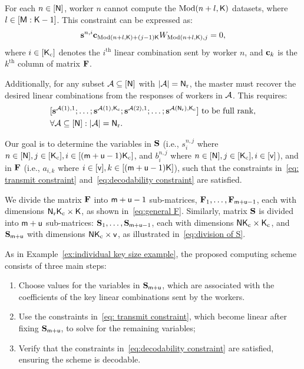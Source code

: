 \documentclass[conference,letterpaper]{IEEEtran}
\begin{document}
For each \( n \in [{\sf N}] \), worker \( n \) cannot compute the \( \text{Mod}(n+l,{\sf K}) \) datasets, where \( l \in [{\sf M}:{\sf K} - 1] \). This constraint can be expressed as:
\begin{align}
{\bf s}^{n,i} {\bf c}_{\text{Mod}(n+l,{\sf K}) + (j-1){\sf K}} W_{\text{Mod}(n+l,{\sf K}), j} = 0,  \label{eq: transmit constraint}
\end{align}
where \( i \in [{\sf K}_{\rm c}] \) denotes the \( i^{\text{th}} \) linear combination sent by worker \( n \), and \( {\bf c}_{k} \) is the \( k^{\text{th}} \) column of matrix \( {\bf F} \).

Additionally, for any subset \({\cal A} \subseteq [{\sf N}]\) with \( |{\cal A}| = {\sf N}_{\rm r} \), the master must recover the desired linear combinations from the responses of workers in \({\cal A}\). This requires:
\begin{align}
\begin{aligned}
&[{\bf s}^{{\cal A}(1),1}; \ldots; {\bf s}^{{\cal A}(1),{\sf K}_{\rm c}}; {\bf s}^{{\cal A}(2),1}; \ldots; {\bf s}^{{\cal A}({\sf N}_{\rm r}),{\sf K}_{\rm c}}] \ \text{to be full rank}, \\
&\forall {\cal A} \subseteq [{\sf N}]: |{\cal A}| = {\sf N}_{\rm r}.
\end{aligned} \label{eq:decodability constraint}
\end{align}

Our goal is to determine the variables in \({\bf S}\) (i.e., \( s^{n,j}_{i} \) where \( n \in [{\sf N}], j \in [{\sf K}_{\rm c}], i \in [({\sf m}+{\sf u}-1){\sf K}_{\rm c}] \), and \( b^{n,j}_{i} \) where \( n \in [{\sf N}], j \in [{\sf K}_{\rm c}], i \in [{\sf v}] \)), and in \({\bf F}\) (i.e., \( a_{i,k} \) where \( i \in [{\sf v}], k \in [({\sf m}+{\sf u}-1){\sf K}] \)), such that the constraints in~\eqref{eq: transmit constraint} and~\eqref{eq:decodability constraint} are satisfied.


We divide the matrix ${\bf F}$ into ${\sf m}+{\sf u}-1$ sub-matrices, ${\bf F}_1, \ldots, {\bf F}_{{\sf m}+{\sf u}-1}$, each with dimensions ${\sf N}_{\rm r}{\sf K}_{\rm c} \times {\sf K}$, as shown in~\eqref{eq:general F}. Similarly, matrix ${\bf S}$ is divided into ${\sf m}+{\sf u}$ sub-matrices: ${\bf S}_1, \ldots, {\bf S}_{{\sf m}+{\sf u}-1}$, each with dimensions ${\sf N} {\sf K}_{\rm c} \times {\sf K}_{\rm c}$, and ${\bf S}_{{\sf m}+{\sf u}}$ with dimensions ${\sf N} {\sf K}_{\rm c} \times {\sf v}$, as illustrated in~\eqref{eq:division of S}.

As in Example~\ref{ex:individual key size example}, the proposed computing scheme consists of three main steps:
\begin{enumerate}
\item Choose values for the variables in ${\bf S}_{{\sf m}+{\sf u}}$, which are associated with the coefficients of the key linear combinations sent by the workers.
\item Use the constraints in~\eqref{eq: transmit constraint}, which become linear after fixing ${\bf S}_{{\sf m}+{\sf u}}$, to solve for the remaining variables;
\item Verify that the constraints in~\eqref{eq:decodability constraint} are satisfied, ensuring the scheme is decodable.
\end{enumerate}
\end{document}
